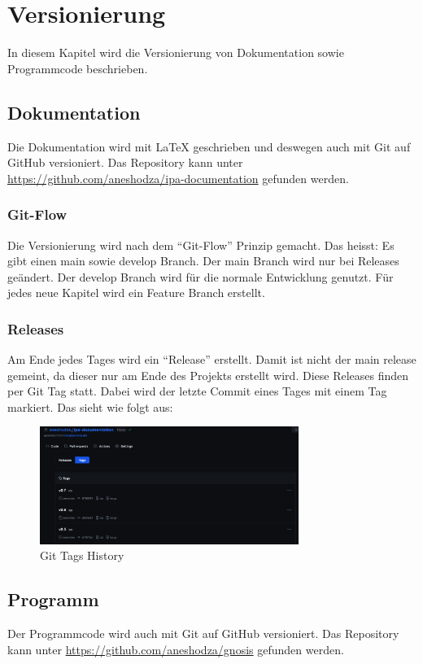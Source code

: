\section{Versionierung}
\label{sec:versioning}
In diesem Kapitel wird die Versionierung von Dokumentation sowie Programmcode beschrieben.
\subsection{Dokumentation}
Die Dokumentation wird mit LaTeX geschrieben und deswegen auch mit Git auf GitHub versioniert. Das
Repository kann unter \url{https://github.com/aneshodza/ipa-documentation} gefunden werden.
\subsubsection{Git-Flow}
Die Versionierung wird nach dem \enquote{Git-Flow} Prinzip gemacht. Das heisst: Es gibt einen main sowie
develop Branch. Der main Branch wird nur bei Releases geändert. Der develop Branch wird für die normale
Entwicklung genutzt. Für jedes neue Kapitel wird ein Feature Branch erstellt.
\subsubsection{Releases}
Am Ende jedes Tages wird ein \enquote{Release} erstellt. Damit ist nicht der main release gemeint, da dieser
nur am Ende des Projekts erstellt wird. Diese Releases finden per Git Tag statt. Dabei wird der letzte
Commit eines Tages mit einem Tag markiert. Das sieht wie folgt aus:
\begin{figure}[H]
    \centering
    \includegraphics[width=0.75\textwidth]{images/misc/git_tag.png}
    \caption[Ein Screenshot der genutzten Git Tag History für die Versionierung]{Git Tags History}
    \label{fig:git_tag}
\end{figure}

\subsection{Programm}
Der Programmcode wird auch mit Git auf GitHub versioniert. Das Repository kann unter
\url{https://github.com/aneshodza/gnosis} gefunden werden.
